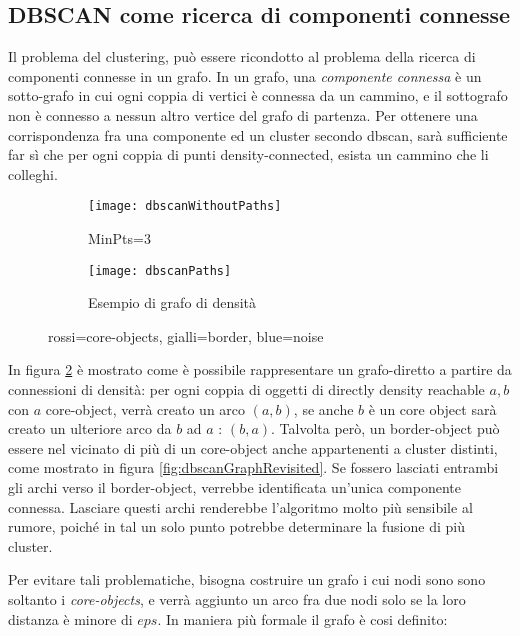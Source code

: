 \subsection{DBSCAN come ricerca di componenti connesse }
Il problema del clustering, può essere ricondotto al problema della ricerca di componenti connesse in un grafo.
In un grafo, una \emph{componente connessa} è un sotto-grafo in cui ogni coppia di vertici è connessa da un cammino, e il sottografo non è connesso  a nessun altro vertice  del grafo di partenza. Per ottenere una corrispondenza fra una  componente ed  un cluster secondo dbscan, sarà sufficiente far sì che per ogni coppia di punti  density-connected, esista un cammino che li colleghi.
\begin{figure}
    \centering
    \begin{subfigure}[b]{0.45\textwidth}
        \centering
        \texttt{[image: dbscanWithoutPaths]}
       	\caption{ MinPts=3}
         \label{fig:densityConnectedObjects}
    \end{subfigure}
    \hfill
    \begin{subfigure}[b]{0.45\textwidth}
        \centering
        \texttt{[image: dbscanPaths]}
        \caption{Esempio di grafo di densità}
         \label{fig:graphdensityConnectedObjects}
    \end{subfigure}
    \hfill
    \caption{rossi=core-objects, gialli=border,
    	blue=noise}
    \label{fig:dbscangraph}
\end{figure} 
In figura \ref{fig:graphdensityConnectedObjects} è mostrato come è possibile rappresentare un grafo-diretto a partire da connessioni di densità: per ogni coppia di oggetti di  directly density reachable $a,b$ con $a$ core-object,
verrà creato un arco $(a,b)$, se anche $b$ è un core object sarà creato un ulteriore arco da $b$ ad $a$ : $(b,a)$.
Talvolta però, un border-object può essere nel vicinato di più di un core-object anche appartenenti a cluster distinti, come mostrato in figura \ref{fig:dbscanGraphRevisited}. Se fossero lasciati entrambi gli archi verso il border-object, verrebbe identificata un'unica componente connessa. Lasciare questi archi renderebbe l'algoritmo molto più sensibile al rumore, poiché in tal un solo punto potrebbe determinare la fusione di più cluster.

Per evitare tali problematiche, bisogna costruire un grafo i cui nodi sono sono soltanto i \emph{core-objects}, e verrà aggiunto un arco fra due nodi solo se la loro distanza è minore di $eps$.  In maniera più formale il grafo è cosi definito:

